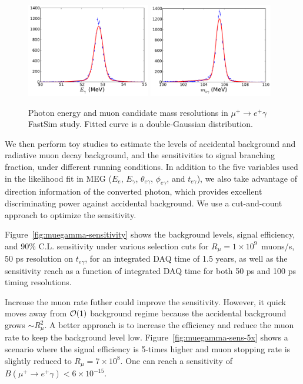 \begin{figure}[htbp]
   \centering
   \includegraphics[width=0.48\textwidth]{ChargedLeptons/Figures/muegamma-gamma-resolution.pdf} 
   \includegraphics[width=0.48\textwidth]{ChargedLeptons/Figures/muegamma-mumass-resolution.pdf} 
   \caption{Photon energy and muon candidate mass resolutions in 
   $\mu^+\to e^+\gamma$ FastSim study. Fitted curve is a double-Gaussian 
   distribution.}
   \label{fig:muegamma-resolutions}
\end{figure}


We then perform toy studies to estimate the levels of accidental background
and radiative muon decay background, and the sensitivities to signal branching
fraction, under different running conditions. In addition to the five variables
used in the likelihood fit in MEG ($E_e$, $E_\gamma$, $\theta_{e\gamma}$, 
$\phi_{e\gamma}$, and $t_{e\gamma}$), we also take advantage of direction 
information of the converted photon, which provides excellent discriminating
power against accidental background. We use a cut-and-count approach to
optimize the sensitivity. 

Figure~\ref{fig:muegamma-sensitivity} shows the background levels, 
signal efficiency, and 90\%
C.L. sensitivity under various selection cuts for 
$R_\mu=1\times 10^{9}$~muons/s, 50 ps resolution on $t_{e\gamma}$, for
an integrated DAQ time of 1.5 years, as well as the sensitivity reach
as a function of integrated DAQ time for both 50 ps and 100 ps timing
resolutions. 

Increase the muon rate futher could improve the sensitivity. However,
it quick moves away from ${\cal O}(1)$ background regime because the accidental
background grows $\sim R_\mu^2$. A better approach is to increase the
efficiency and reduce the muon rate to keep the background level low. 
Figure~\ref{fig:muegamma-sens-5x} 
shows a scenario where the signal efficiency is 5-times higher
and muon stopping rate is slightly reduced to $R_\mu=7\times 10^{8}$. 
One can reach a sensitivity of $B(\mu^+\to e^+\gamma)<6\times 10^{-15}$.

